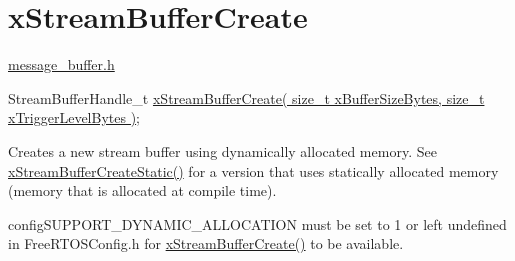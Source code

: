 \hypertarget{group__x_stream_buffer_create}{}\section{x\+Stream\+Buffer\+Create}
\label{group__x_stream_buffer_create}
\hyperlink{message__buffer_8h}{message\+\_\+buffer.\+h}


\begin{DoxyPre}
StreamBufferHandle\_t \hyperlink{stream__buffer_8h_a39aa4dd8b83e2df7ded291f863fb5fed}{xStreamBufferCreate( size\_t xBufferSizeBytes, size\_t xTriggerLevelBytes )};
\end{DoxyPre}


Creates a new stream buffer using dynamically allocated memory. See \hyperlink{stream__buffer_8h_a3c248575ac1b83801db605b32a118f77}{x\+Stream\+Buffer\+Create\+Static()} for a version that uses statically allocated memory (memory that is allocated at compile time).

config\+S\+U\+P\+P\+O\+R\+T\+\_\+\+D\+Y\+N\+A\+M\+I\+C\+\_\+\+A\+L\+L\+O\+C\+A\+T\+I\+ON must be set to 1 or left undefined in Free\+R\+T\+O\+S\+Config.\+h for \hyperlink{stream__buffer_8h_a39aa4dd8b83e2df7ded291f863fb5fed}{x\+Stream\+Buffer\+Create()} to be available.


